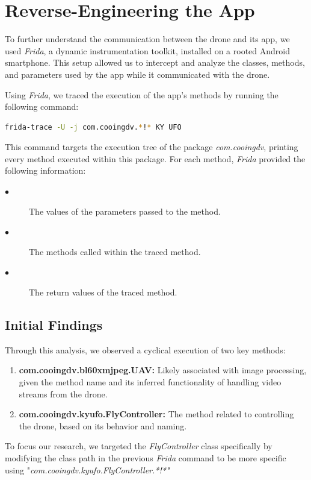 \section{Reverse-Engineering the App}\label{sec:5}
To further understand the communication between the drone and its app, we used \textit{Frida}, a dynamic instrumentation toolkit, installed on a rooted Android smartphone. This setup allowed us to intercept and analyze the classes, methods, and parameters used by the app while it communicated with the drone.

Using \textit{Frida}, we traced the execution of the app’s methods by running the following command:

\begin{lstlisting}[language=bash]
  frida-trace -U -j com.cooingdv.*!* KY UFO
\end{lstlisting}

This command targets the execution tree of the package \textit{com.cooingdv}, printing every method executed within this package. For each method, \textit{Frida} provided the following information:
\begin{description}
    \item[$\bullet$] The values of the parameters passed to the method.
    \item[$\bullet$] The methods called within the traced method.
    \item[$\bullet$] The return values of the traced method.
\end{description}
\subsection*{Initial Findings}
Through this analysis, we observed a cyclical execution of two key methods:
\begin{enumerate}
    \item \textbf{com.cooingdv.bl60xmjpeg.UAV:} Likely associated with image processing, given the method name and its inferred functionality of handling video streams from the drone.
    \item \textbf{com.cooingdv.kyufo.FlyController:} The method related to controlling the drone, based on its behavior and naming.
\end{enumerate}
To focus our research, we targeted the \textit{FlyController} class specifically by modifying the class path in the previous \textit{Frida} command to be more specific using "\textit{com.cooingdv.kyufo.FlyController.*!*"}
